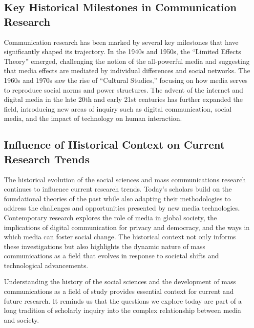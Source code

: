 \documentclass[
]{book}
\begin{document}
\hypertarget{key-historical-milestones-in-communication-research}{%
\subsection*{Key Historical Milestones in Communication Research}\label{key-historical-milestones-in-communication-research}}

Communication research has been marked by several key milestones that have significantly shaped its trajectory. In the 1940s and 1950s, the ``Limited Effects Theory'' emerged, challenging the notion of the all-powerful media and suggesting that media effects are mediated by individual differences and social networks. The 1960s and 1970s saw the rise of ``Cultural Studies,'' focusing on how media serves to reproduce social norms and power structures. The advent of the internet and digital media in the late 20th and early 21st centuries has further expanded the field, introducing new areas of inquiry such as digital communication, social media, and the impact of technology on human interaction.

\hypertarget{influence-of-historical-context-on-current-research-trends}{%
\subsection*{Influence of Historical Context on Current Research Trends}\label{influence-of-historical-context-on-current-research-trends}}

The historical evolution of the social sciences and mass communications research continues to influence current research trends. Today's scholars build on the foundational theories of the past while also adapting their methodologies to address the challenges and opportunities presented by new media technologies. Contemporary research explores the role of media in global society, the implications of digital communication for privacy and democracy, and the ways in which media can foster social change. The historical context not only informs these investigations but also highlights the dynamic nature of mass communications as a field that evolves in response to societal shifts and technological advancements.

Understanding the history of the social sciences and the development of mass communications as a field of study provides essential context for current and future research. It reminds us that the questions we explore today are part of a long tradition of scholarly inquiry into the complex relationship between media and society.
\end{document}
